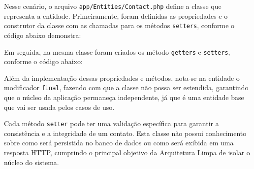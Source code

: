         \par Nesse cenário, o arquivo \texttt{app/Entities/Contact.php} define a classe que representa a entidade. Primeiramente, foram definidas as propriedades e o construtor da classe com as chamadas para os métodos \texttt{setters}, conforme o código abaixo demonstra:

        

        \par Em seguida, na mesma classe foram criados os método \texttt{getters} e \texttt{setters}, conforme o código abaixo:
        
        

        \par Além da implementação dessas propriedades e métodos, nota-se na entidade o modificador \texttt{final}, fazendo com que a classe não possa ser estendida, garantindo que o núcleo da aplicação permaneça independente, já que é uma entidade base que vai ser usada pelos casos de uso.
        
        \par Cada método \texttt{setter} pode ter uma validação específica para garantir a consistência e a integridade de um contato. Esta classe não possui conhecimento sobre como será persistida no banco de dados ou como será exibida em uma resposta HTTP, cumprindo o principal objetivo da Arquitetura Limpa de isolar o núcleo do sistema.



